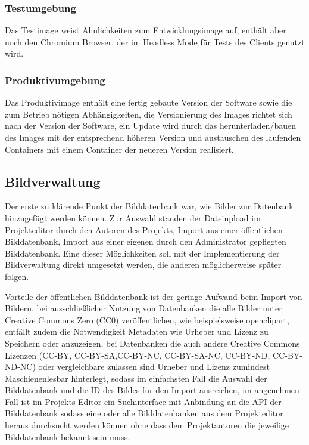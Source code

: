 \subsubsection{Testumgebung}

Das Testimage weist Ähnlichkeiten zum Entwicklungsimage auf, enthält
aber noch den Chromium Browser, der im Headless Mode für Tests des Clients
genutzt wird.

\subsubsection{Produktivumgebung}

Das Produktivimage enthält eine fertig gebaute Version der Software sowie die
zum Betrieb nötigen Abhängigkeiten, die Versionierung des Images richtet sich
nach der Version der Software, ein Update wird durch das herunterladen/bauen des
Images mit der entsprechend höheren Version und austauschen des laufenden
Containers mit einem Container der neueren Version realisiert.

\subsection{Bildverwaltung}

Der erste zu klärende Punkt der Bilddatenbank war, wie Bilder zur Datenbank
hinzugefügt werden können. Zur Auswahl standen der Dateiupload im Projekteditor
durch den Autoren des Projekts, Import aus einer öffentlichen Bilddatenbank,
Import aus einer eigenen durch den Administrator gepflegten Bilddatenbank.
Eine dieser Möglichkeiten soll mit der Implementierung der Bildverwaltung direkt
umgesetzt werden, die anderen möglicherweise später folgen.

Vorteile der öffentlichen Bilddatenbank ist der geringe Aufwand beim Import von
Bildern, bei ausschließlicher Nutzung von Datenbanken die alle Bilder unter
Creative Commons Zero (CC0) veröffentlichen, wie beispielsweise openclipart,
entfällt zudem die Notwendigkeit Metadaten wie Urheber und Lizenz zu Speichern
oder anzuzeigen, bei Datenbanken die auch andere Creative Commons Lizenzen
(CC-BY, CC-BY-SA,CC-BY-NC, CC-BY-SA-NC, CC-BY-ND, CC-BY-ND-NC) oder
vergleichbare zulassen sind Urheber und Lizenz zumindest Maschienenlesbar
hinterlegt, sodass im einfachsten Fall die Auswahl der Bilddatenbank und die ID
des Bildes für den Import ausreichen, im angenehmen Fall ist im Projekts Editor
ein Suchinterface mit Anbindung an die API der Bilddatenbank sodass eine oder
alle Bilddatenbanken aus dem Projekteditor heraus durchsucht werden können ohne
dass dem Projektautoren die jeweilige Bilddatenbank bekannt sein muss.

